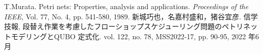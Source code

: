 \def\line{−\hspace*{-.7zw}−}

\begin{thebibliography}{99}

 T.Murata. Petri nets: Properties, analysis and applications. \textit{Proceedings of the IEEE}, Vol. 77, No. 4, pp. 541-580, 1989.
 新城巧也，名嘉村盛和，猪谷宜彦. 信学技報, 段替え作業を考慮したフローショップスケジューリング問題のペトリネットモデリングとQUBO 定式化. vol. 122, no. 78, MSS2022-17, pp. 90-95, 2022 年6 月

\end{thebibliography}
